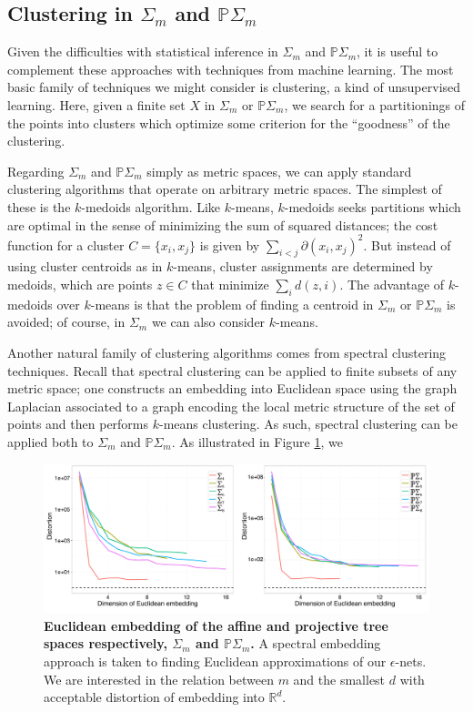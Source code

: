 \documentclass[a4paper,11pt]{article}
\begin{document}
\subsection{Clustering in $\Sigma_m$ and $\mathbb{P}\Sigma_m$}

Given the difficulties with statistical inference in $\Sigma_m$ and $\mathbb{P}\Sigma_m$, it is useful to complement these approaches with techniques from machine learning.
The most basic family of techniques we might consider is clustering, a kind of unsupervised learning.
Here, given a finite set $X$ in $\Sigma_m$ or $\mathbb{P}\Sigma_m$, we search for a partitionings of the points into clusters which optimize some criterion for the ``goodness'' of the clustering.

Regarding $\Sigma_m$ and $\mathbb{P}\Sigma_m$ simply as metric spaces, we can apply standard clustering algorithms that operate on arbitrary metric spaces.
The simplest of these is the $k$-medoids algorithm.
Like $k$-means, $k$-medoids seeks partitions which are optimal in the sense of minimizing the sum of squared distances; the cost function for a cluster $C = \{x_i, x_j\}$ is given by $\sum_{i < j} \partial(x_i,x_j)^2$.
But instead of using cluster centroids as in $k$-means, cluster assignments are determined by medoids, which are points $z \in C$ that minimize $\sum_i d(z,i)$.
The advantage of $k$-medoids over $k$-means is that the problem of finding a centroid in $\Sigma_m$ or $\mathbb{P}\Sigma_m$ is avoided; of course, in $\Sigma_m$ we can also consider $k$-means.

Another natural family of clustering algorithms comes from spectral clustering techniques.
Recall that spectral clustering can be applied to finite subsets of any metric space; one constructs an embedding into Euclidean space using the graph Laplacian associated to a graph encoding the local metric structure of the set of points and then performs $k$-means clustering.
As such, spectral clustering can be applied both to $\Sigma_m$ and $\mathbb{P}\Sigma_m$.
As illustrated in Figure \ref{fig:embedding}, we 

\begin{figure}
    \centering
    \includegraphics[width=\linewidth]{../figures/stats_embedding.pdf}
    \caption{{\bf Euclidean embedding of the affine and projective tree spaces respectively, $\Sigma_m$ and $\mathbb{P}\Sigma_m$.} A spectral embedding approach is taken to finding Euclidean approximations of our $\epsilon$-nets. We are interested in the relation between $m$ and the smallest $d$ with acceptable distortion of embedding into $\mathbb{R}^d$.}
    \label{fig:embedding}
\end{figure}
\end{document}
